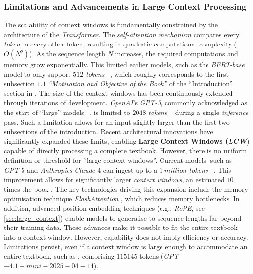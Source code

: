 \subsubsection[Limitations and Advancements]{Limitations and Advancements in Large Context Processing}\label{subsec:limit_context_prel}
%
The scalability of context windows is fundamentally constrained by the architecture of the \textit{Transformer}.
The \textit{self-attention mechanism} compares every \textit{token} to every other token, resulting in quadratic computational complexity ($O(N^2)$).
As the sequence length $N$ increases, the required computations and memory grow exponentially.
This limited earlier models, such as
the \textit{BERT-base} model to only support $512$ \textit{tokens} ~\citep{devlin2019bert}, which roughly corresponds to the first subsection \textit{$1.1$ \enquote{Motivation and Objective of the Book}} of the \enquote{Introduction} section in \citet{bb2}.
%
The size of the context windows has been continuously extended through iterations of development.
\textit{OpenAI}'s \textit{GPT-3}, commonly acknowledged as the start of \enquote{large} models ~\citep[p.1]{langlais2025commoncorpuslargestcollection}, is limited to $2048$ \textit{tokens} ~\citep{gpt3} during a single \textit{inference} pass.
Such a limitation allows for an input slightly larger than the first two subsections of the introduction.
Recent architectural innovations have significantly expanded these limits, enabling \textbf{Large Context Windows (\textit{LCW}}) capable of directly processing a complete textbook.
However, there is no uniform definition or threshold for \enquote{large context windows}. 
Current models, such as \textit{GPT-$5$} and \textit{Anthropics} \textit{Claude $4$} can ingest up to a $1~million$ \textit{tokens} ~\citep{openai2025gpt4, claude2025feature}.
This improvement allows for significantly larger \textit{context windows}, an estimated $10$ times the book .
%
The key technologies driving this expansion include the memory optimisation technique \textit{FlashAttention} \citep{dao2022flashattention}, which reduces memory bottlenecks.
In addition, advanced position embedding techniques (e.g., \textit{RoPE}, see \cref{sec:large_context}) enable models to generalise to sequence lengths far beyond their training data.
These advances make it possible to fit the entire \citet{bb2} textbook into a context window.
%
However, capability does not imply efficiency or accuracy.
Limitations persist, even if a context window is large enough to accommodate an entire textbook, such as \citet{bb2}, comprising $115145$ tokens \citep{gpt2025tokenizer} (\textit{GPT$-4.1-mini-2025-04-14$}).
